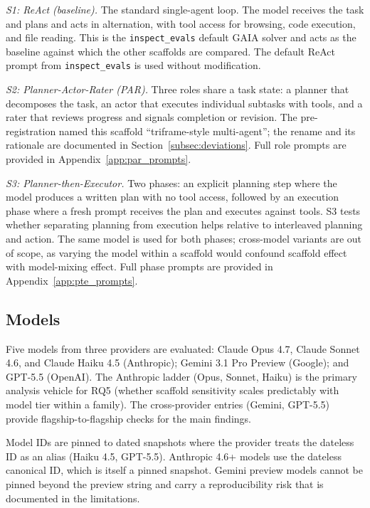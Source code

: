 \documentclass[10pt]{article} %
\begin{document}
        \textit{S1: ReAct (baseline).} The standard single-agent loop. The model receives the task and plans and acts in alternation, with tool access for browsing, code execution, and file reading. This is the \texttt{inspect\_evals} default GAIA solver and acts as the baseline against which the other scaffolds are compared. The default ReAct prompt from \texttt{inspect\_evals} is used without modification.
        
        \textit{S2: Planner-Actor-Rater (PAR).} Three roles share a task state: a planner that decomposes the task, an actor that executes individual subtasks with tools, and a rater that reviews progress and signals completion or revision. The pre-registration named this scaffold ``triframe-style multi-agent''; the rename and its rationale are documented in Section~\ref{subsec:deviations}. Full role prompts are provided in Appendix~\ref{app:par_prompts}.
        
        \textit{S3: Planner-then-Executor.} Two phases: an explicit planning step where the model produces a written plan with no tool access, followed by an execution phase where a fresh prompt receives the plan and executes against tools. S3 tests whether separating planning from execution helps relative to interleaved planning and action. The same model is used for both phases; cross-model variants are out of scope, as varying the model within a scaffold would confound scaffold effect with model-mixing effect. Full phase prompts are provided in Appendix~\ref{app:pte_prompts}.
    \subsection{Models}\label{subsec:models}
    
        Five models from three providers are evaluated: Claude Opus 4.7, Claude Sonnet 4.6, and Claude Haiku 4.5 (Anthropic); Gemini 3.1 Pro Preview (Google); and GPT-5.5 (OpenAI). The Anthropic ladder (Opus, Sonnet, Haiku) is the primary analysis vehicle for RQ5 (whether scaffold sensitivity scales predictably with model tier within a family). The cross-provider entries (Gemini, GPT-5.5) provide flagship-to-flagship checks for the main findings.
    
        Model IDs are pinned to dated snapshots where the provider treats the dateless ID as an alias (Haiku 4.5, GPT-5.5). Anthropic 4.6+ models use the dateless canonical ID, which is itself a pinned snapshot. Gemini preview models cannot be pinned beyond the preview string and carry a reproducibility risk that is documented in the limitations.
    
\end{document}
